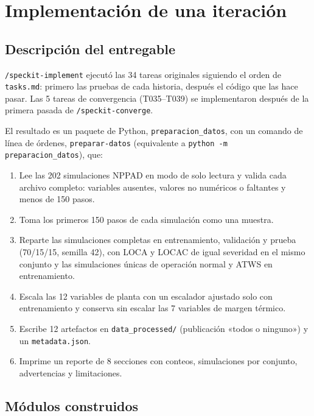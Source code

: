 \documentclass[12pt,a4paper]{article}
\newenvironment{documentogenerado}[2]{%
  \def\doccomando{#1}\def\docruta{#2}%
  \par\begingroup\small\setstretch{1.15}\sloppy%
}{\endgroup\par\medskip}
\begin{document}
\begin{documentogenerado}{/speckit-tasks (fase 7: /speckit-converge)}{specs\slash 001-preparacion-datos\slash tasks.md}
\begin{itemize}
\end{itemize}
\end{documentogenerado}

\newpage
\section{Implementación de una iteración}

\subsection{Descripción del entregable}
\texttt{/speckit-implement} ejecutó las 34 tareas originales siguiendo el orden de \texttt{tasks.md}: primero las pruebas de cada historia, después el código que las hace pasar. Las 5 tareas de convergencia (T035--T039) se implementaron después de la primera pasada de \texttt{/speckit-converge}.

El resultado es un paquete de Python, \texttt{preparacion\_datos}, con un comando de línea de órdenes, \texttt{preparar-datos} (equivalente a \texttt{python -m preparacion\_datos}), que:
\begin{enumerate}
  \item Lee las 202 simulaciones NPPAD en modo de solo lectura y valida cada archivo completo: variables ausentes, valores no numéricos o faltantes y menos de 150 pasos.
  \item Toma los primeros 150 pasos de cada simulación como una muestra.
  \item Reparte las simulaciones completas en entrenamiento, validación y prueba (70/15/15, semilla 42), con LOCA y LOCAC de igual severidad en el mismo conjunto y las simulaciones únicas de operación normal y ATWS en entrenamiento.
  \item Escala las 12 variables de planta con un escalador ajustado solo con entrenamiento y conserva sin escalar las 7 variables de margen térmico.
  \item Escribe 12 artefactos en \texttt{data\_processed/} (publicación «todos o ninguno») y un \texttt{metadata.json}.
  \item Imprime un reporte de 8 secciones con conteos, simulaciones por conjunto, advertencias y limitaciones.
\end{enumerate}

\subsection{Módulos construidos}
\end{document}
